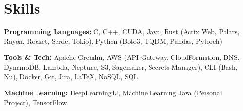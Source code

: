 ﻿
\section{Skills}

\textbf{Programming Languages: } C, C++, CUDA, Java, Rust (Actix Web, Polars, Rayon, Rocket, Serde, Tokio), Python (Boto3, TQDM, Pandas, Pytorch)

\bigbreak

\textbf{Tools \& Tech: } Apache Gremlin, AWS (API Gateway, CloudFormation, DNS, DynamoDB, Lambda, Neptune, S3, Sagemaker, Secrets Manager), CLI (Bash, Nu), Docker, Git, Jira, \LaTeX, NoSQL, SQL

\bigbreak

\textbf{Machine Learning: } DeepLearning4J, Machine Learning Java (Personal Project), TensorFlow